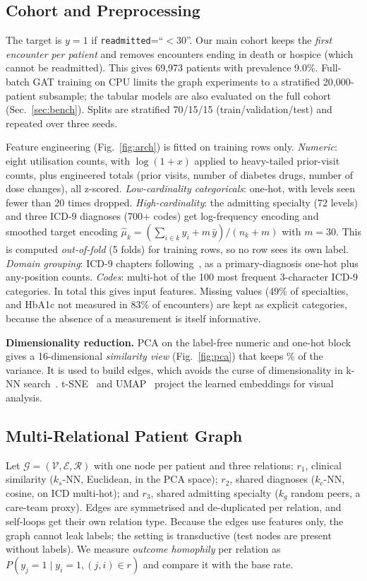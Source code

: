 \documentclass[conference]{IEEEtran}
\begin{document}
\subsection{Cohort and Preprocessing}
The target is $y{=}1$ if \texttt{readmitted}{=}``$<$30''. Our main cohort keeps the
\emph{first encounter per patient} and removes encounters ending in death or hospice (which
cannot be readmitted). This gives 69{,}973 patients with prevalence 9.0\%. Full-batch GAT
training on CPU limits the graph experiments to a stratified 20{,}000-patient subsample; the
tabular models are also evaluated on the full cohort (Sec.~\ref{sec:bench}). Splits are
stratified 70/15/15 (train/validation/test) and repeated over three seeds.

Feature engineering (Fig.~\ref{fig:arch}) is fitted on training rows only.
\textit{Numeric}: eight utilisation counts, with $\log(1{+}x)$ applied to heavy-tailed prior-visit
counts, plus engineered totals (prior visits, number of diabetes drugs, number of dose changes),
all z-scored.
\textit{Low-cardinality categoricals}: one-hot, with levels seen fewer than 20 times dropped.
\textit{High-cardinality}: the admitting specialty (72 levels) and three ICD-9 diagnoses
(700+ codes) get log-frequency encoding and smoothed target encoding
$\hat{\mu}_k = (\sum_{i\in k} y_i + m\,\bar{y})/(n_k + m)$ with $m{=}30$. This is computed
\emph{out-of-fold} (5 folds) for training rows, so no row sees its own label.
\textit{Domain grouping}: ICD-9 chapters following~\cite{strack2014}, as a primary-diagnosis
one-hot plus any-position counts. \textit{Codes}: multi-hot of the 100 most frequent 3-character
ICD-9 categories. In total this gives \nFeatures{} input features. Missing values (49\% of specialties,
and HbA1c not measured in 83\% of encounters) are kept as explicit categories, because the
absence of a measurement is itself informative.

\textbf{Dimensionality reduction.} PCA on the label-free numeric and one-hot block gives a
16-dimensional \emph{similarity view} (Fig.~\ref{fig:pca}) that keeps \pcaVar\% of the
variance. It is used to build edges, which avoids the curse of dimensionality in k-NN
search~\cite{vandermaaten2008}. t-SNE~\cite{vandermaaten2008} and UMAP~\cite{mcinnes2018}
project the learned embeddings for visual analysis.

\subsection{Multi-Relational Patient Graph}
Let $\mathcal{G}=(\mathcal{V},\mathcal{E},\mathcal{R})$ with one node per patient and three
relations: $r_1$, clinical similarity ($k_s$-NN, Euclidean, in the PCA space); $r_2$, shared
diagnoses ($k_c$-NN, cosine, on ICD multi-hot); and $r_3$, shared admitting specialty ($k_g$
random peers, a care-team proxy). Edges are symmetrised and de-duplicated per relation, and
self-loops get their own relation type. Because the edges use features only, the graph cannot
leak labels; the setting is transductive (test nodes are present without labels). We measure
\emph{outcome homophily} per relation as $P(y_j{=}1 \mid y_i{=}1, (j,i)\in r)$ and compare it
with the base rate.
\end{document}
